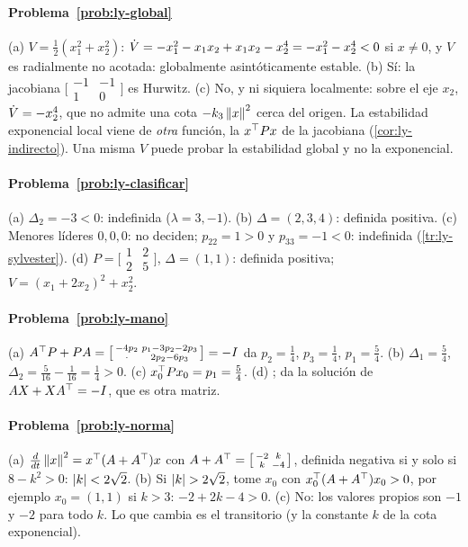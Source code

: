 \paragraph{Problema~\ref{prob:ly-global}}
(a) $V=\tfrac12(x_1^2+x_2^2)$: $\dot V=-x_1^2-x_1x_2+x_1x_2-x_2^4=-x_1^2-x_2^4<0$ si $x\neq0$, y $V$ es radialmente no acotada: globalmente asintóticamente estable. (b) Sí: la jacobiana $\bigl[\begin{smallmatrix}-1&-1\\1&0\end{smallmatrix}\bigr]$ es Hurwitz. (c) No, y ni siquiera localmente: sobre el eje $x_2$, $\dot V=-x_2^4$, que no admite una cota $-k_3\left\lVert x\right\rVert^2$ cerca del origen. La estabilidad exponencial local viene de \emph{otra} función, la $x^{\top} Px$ de la jacobiana (\cref{cor:ly-indirecto}). Una misma $V$ puede probar la estabilidad global y no la exponencial.

\paragraph{Problema~\ref{prob:ly-clasificar}}
(a) $\Delta_2=-3<0$: indefinida ($\lambda=3,-1$). (b) $\Delta=(2,3,4)$: definida positiva. (c) Menores líderes $0,0,0$: no deciden; $p_{22}=1>0$ y $p_{33}=-1<0$: indefinida (\cref{tr:ly-sylvester}). (d) $P=\bigl[\begin{smallmatrix}1&2\\2&5\end{smallmatrix}\bigr]$, $\Delta=(1,1)$: definida positiva; $V=(x_1+2x_2)^2+x_2^2$.

\paragraph{Problema~\ref{prob:ly-mano}}
(a) $A^{\top} P+PA=\bigl[\begin{smallmatrix}-4p_2&p_1-3p_2-2p_3\\ \cdot&2p_2-6p_3\end{smallmatrix}\bigr]=-I$ da $p_2=\tfrac14$, $p_3=\tfrac14$, $p_1=\tfrac54$. (b) $\Delta_1=\tfrac54$, $\Delta_2=\tfrac5{16}-\tfrac1{16}=\tfrac14>0$. (c) $x_0^{\top} Px_0=p_1=\tfrac54$. (d) ;  da la solución de $AX+XA^{\top}=-I$, que es otra matriz.

\paragraph{Problema~\ref{prob:ly-norma}}
(a) $\frac{d}{dt}\left\lVert x\right\rVert^2=x^{\top}(A+A^{\top})x$ con $A+A^{\top}=\bigl[\begin{smallmatrix}-2&k\\k&-4\end{smallmatrix}\bigr]$, definida negativa si y solo si $8-k^2>0$: $\left\lvert k\right\rvert<2\sqrt2$. (b) Si $\left\lvert k\right\rvert>2\sqrt2$, tome $x_0$ con $x_0^{\top}(A+A^{\top})x_0>0$, por ejemplo $x_0=(1,1)$ si $k>3$: $-2+2k-4>0$. (c) No: los valores propios son $-1$ y $-2$ para todo $k$. Lo que cambia es el transitorio (y la constante $k$ de la cota exponencial).

